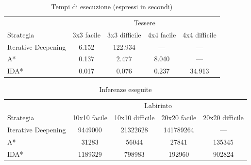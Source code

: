 \documentclass[a4paper,oneside,12pt]{book}
\begin{document}
	\begin{table}
		\centering
		\begin{tabular}{l c c c c}
			\toprule %
			& \multicolumn{4}{c}{Tessere} \\ %
			\cmidrule(l){2-5} %
			Strategia & 3x3 facile & 3x3 difficile & 4x4 facile & 4x4 difficile\\ %
			\midrule %
			Iterative Deepening
			& 6.152	 & 122.934 & --- & --- \\ %
			A*
			& 0.137 & 2.477 & 8.040 & ---\\ %
			IDA*
			& 0.017 & 0.076 & 0.237 & 34.913 \\ %

			\bottomrule
		\end{tabular}
		\caption{Tempi di esecuzione (espressi in secondi)}
	\end{table}
	\begin{table}
		\centering
		\begin{tabular}{l c c c c}
			\toprule %
			& \multicolumn{4}{c}{Labirinto} \\ %
			\cmidrule(l){2-5} %
			Strategia & 10x10 facile & 10x10 difficile & 20x20 facile & 20x20 difficile\\ %
			\midrule %
			Iterative Deepening
			& \num{9449000}& \num{21322628} & \num{141789264} & --- \\ %
			A*
			& \num{31283} & \num{56044} & \num{27841} & \num{135345}\\ %
			IDA*
			& \num{1189329} & \num{798983} & \num{192960} & \num{902824} \\ %

			\bottomrule
		\end{tabular}
		\caption{Inferenze eseguite}
	\end{table}
\end{document}
